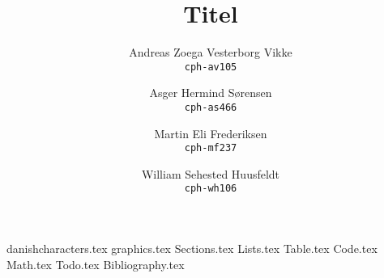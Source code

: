 \documentclass{report}
\title{Titel}
\author{
    Andreas Zoega Vesterborg Vikke\\
    \texttt{cph-av105}
    \and
    Asger Hermind Sørensen\\
    \texttt{cph-as466}
    \and
    Martin Eli Frederiksen\\
    \texttt{cph-mf237}
    \and
    William Sehested Huusfeldt\\
    \texttt{cph-wh106}
}
\date{}
\begin{document}
    \maketitle
    \tableofcontents
    \newpage

    {danishcharacters.tex}
    {graphics.tex}
    {Sections.tex}
    {Lists.tex}
    {Table.tex}
    {Code.tex}
    {Math.tex}
    {Todo.tex}
    {Bibliography.tex}
\end{document}
